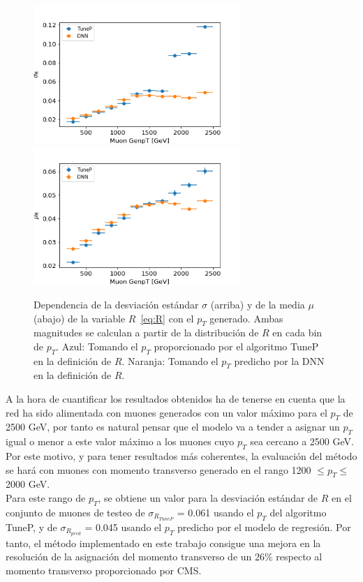 \begin{figure}[h]
\centering
\includegraphics[width=0.7\textwidth]{figures/SigmaR_vs_genpT.png}
\includegraphics[width=0.7\textwidth]{figures/MeanR_vs_genpT.png}
\caption{Dependencia de la desviaci\'on est\'andar $\sigma$ (arriba) y de la media $\mu$ (abajo) de la variable $R$~\eqref{eq:R} con el $p_{T}$ generado. Ambas magnitudes se calculan a partir de la distribuci\'on de $R$ en cada bin de $p_{T}$. Azul: Tomando el $p_{T}$ proporcionado por el algoritmo TuneP en la definici\'on de $R$. Naranja: Tomando el $p_{T}$ predicho por la DNN en la definici\'on de $R$.}
\label{fig:R_vs_genpt}        
\end{figure}

A la hora de cuantificar los resultados obtenidos ha de tenerse en cuenta que la red ha sido alimentada con muones generados con un valor m\'aximo para el $p_{T}$ de 2500 GeV, por tanto es natural pensar que el modelo va a tender a asignar un $p_{T}$ igual o menor a este valor m\'aximo a los muones cuyo $p_{T}$ sea cercano a 2500 GeV. Por este motivo, y para tener resultados m\'as coherentes, la evaluaci\'on del m\'etodo se har\'a con muones con momento transverso generado en el rango 1200 $\leq p_{T} \leq$ 2000 GeV. \\

Para este rango de $p_{T}$, se obtiene un valor para la desviaci\'on est\'andar de $R$ en el conjunto de muones de testeo de $\sigma_{R_{TuneP}}$ = 0.061 usando el $p_{T}$ del algoritmo TuneP, y de $\sigma_{R_{pred}}$ = 0.045 usando el $p_{T}$ predicho por el modelo de regresi\'on. Por tanto, el m\'etodo implementado en este trabajo consigue una mejora en la resoluci\'on de la asignaci\'on del momento transverso de un 26\% respecto al momento transverso proporcionado por CMS. \\

\clearpage
